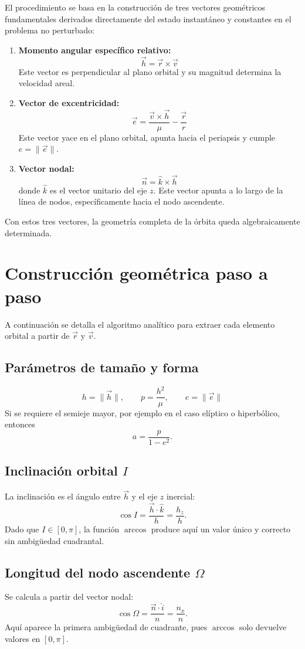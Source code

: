 El procedimiento se basa en la construcción de tres vectores geométricos fundamentales derivados directamente del estado instantáneo y constantes en el problema no perturbado:
\begin{enumerate}
    \item \textbf{Momento angular específico relativo:}
\[
\vec{h} = \vec{r} \times \vec{v}
\]
    Este vector es perpendicular al plano orbital y su magnitud determina la velocidad areal.
    \item \textbf{Vector de excentricidad:}
\[
\vec{e} = \frac{\vec{v} \times \vec{h}}{\mu} - \frac{\vec{r}}{r}
\]
    Este vector yace en el plano orbital, apunta hacia el periapsis y cumple \(e = \|\vec{e}\|\).
    \item \textbf{Vector nodal:}
\[
\vec{n} = \hat{k} \times \vec{h}
\]
    donde \(\hat{k}\) es el vector unitario del eje \(z\). Este vector apunta a lo largo de la línea de nodos, específicamente hacia el nodo ascendente.
\end{enumerate}

Con estos tres vectores, la geometría completa de la órbita queda algebraicamente determinada.

\section{Construcción geométrica paso a paso}
A continuación se detalla el algoritmo analítico para extraer cada elemento orbital a partir de \(\vec{r}\) y \(\vec{v}\).

\subsection{Parámetros de tamaño y forma}
\[
 h = \|\vec{h}\|, \qquad p = \frac{h^2}{\mu}, \qquad e = \|\vec{e}\|
\]
Si se requiere el semieje mayor, por ejemplo en el caso elíptico o hiperbólico, entonces
\[
 a = \frac{p}{1-e^2}.
\]

\subsection{Inclinación orbital \texorpdfstring{$I$}{I}}
La inclinación es el ángulo entre \(\vec{h}\) y el eje \(z\) inercial:
\[
 \cos I = \frac{\vec{h} \cdot \hat{k}}{h} = \frac{h_z}{h}.
\]
Dado que \(I \in [0,\pi]\), la función \(\arccos\) produce aquí un valor único y correcto sin ambigüedad cuadrantal.

\subsection{Longitud del nodo ascendente \texorpdfstring{$\Omega$}{Omega}}
Se calcula a partir del vector nodal:
\[
 \cos\Omega = \frac{\vec{n} \cdot \hat{i}}{n} = \frac{n_x}{n}.
\]
Aquí aparece la primera ambigüedad de cuadrante, pues \(\arccos\) solo devuelve valores en \([0,\pi]\).

